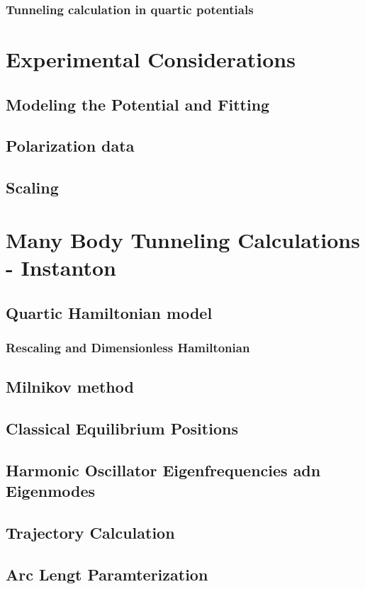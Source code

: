 		\subsubsection{Tunneling calculation in quartic potentials}\blindtext
\section{Experimental Considerations}\blindtext
	\subsection{Modeling the Potential and Fitting}\blindtext
	\subsection{Polarization data}\blindtext
	\subsection{Scaling}\blindtext
\section{Many Body Tunneling Calculations - Instanton}\blindtext
	\subsection{Quartic Hamiltonian model}\blindtext
		\subsubsection{Rescaling and Dimensionless Hamiltonian}	\blindtext
	\subsection{Milnikov method}\blindtext
	\subsection{Classical Equilibrium Positions}\blindtext
	\subsection{Harmonic Oscillator Eigenfrequencies adn Eigenmodes}\blindtext
	\subsection{Trajectory Calculation}\blindtext
	\subsection{Arc Lengt Paramterization}\blindtext
